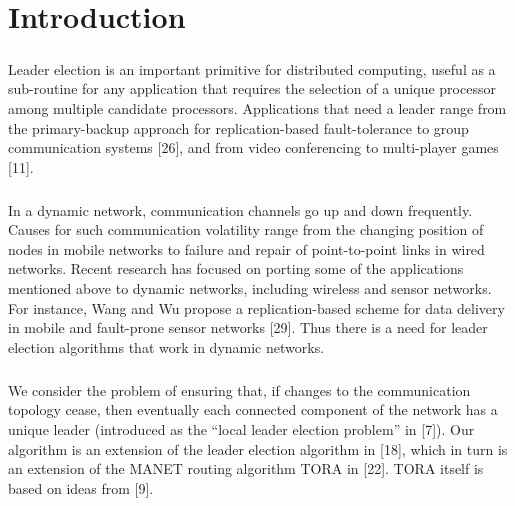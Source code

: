 \chapter{Introduction}
\paragraph{}Leader election is an important primitive for distributed computing, useful as a sub-routine for any application that requires the selection of a unique processor among multiple candidate processors. Applications that need a leader range from the primary-backup approach for replication-based fault-tolerance to group communication systems [26], and from video conferencing to multi-player games [11].
\paragraph{}In a dynamic network, communication channels go up and down frequently. Causes for such communication volatility range from the changing position of nodes in mobile networks to failure and repair of point-to-point links in wired networks. Recent research has focused on porting some of the applications mentioned above to dynamic networks, including wireless and sensor networks. For instance, Wang and Wu propose a replication-based scheme for data delivery in mobile and fault-prone sensor networks [29]. Thus there is a need for leader election algorithms that work in dynamic networks.
\paragraph{}We consider the problem of ensuring that, if changes to the communication topology cease, then eventually each connected component of the network has a unique leader (introduced as the “local leader election problem” in [7]). Our algorithm is an extension of the leader election algorithm in [18], which in turn is an extension of the MANET routing algorithm TORA in [22]. TORA itself is based on ideas from [9].
